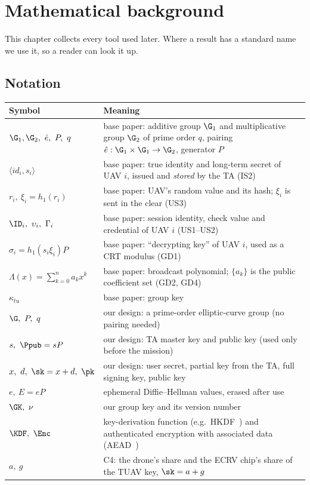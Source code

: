 \chapter{Mathematical background}\label{ch:bg}
This chapter collects every tool used later. Where a result has a standard name we use it, so a reader can look it up.

\section{Notation}
\begin{center}
\small
\begin{tabularx}{\linewidth}{@{}l X@{}}
\toprule
\textbf{Symbol} & \textbf{Meaning}\\
\midrule
$\G_1,\G_2,\ \hat e,\ P,\ q$ & base paper: additive group $\G_1$ and multiplicative group $\G_2$ of prime order $q$, pairing $\hat e:\G_1\times\G_1\to\G_2$, generator $P$\\
$\langle id_i,s_i\rangle$ & base paper: true identity and long-term secret of UAV $i$, issued and \emph{stored} by the TA (IS2)\\
$r_i,\ \xi_i=h_1(r_i)$ & base paper: UAV's random value and its hash; $\xi_i$ is sent in the clear (US3)\\
$\ID_i,\ \upsilon_i,\ \Gamma_i$ & base paper: session identity, check value and credential of UAV $i$ (US1--US2)\\
$\sigma_i=h_1(s_i\xi_i)P$ & base paper: ``decrypting key'' of UAV $i$, used as a CRT modulus (GD1)\\
$\Lambda(x)=\sum_{k=0}^{n}a_kx^k$ & base paper: broadcast polynomial; $\{a_k\}$ is the public coefficient set (GD2, GD4)\\
$\kappa_{tu}$ & base paper: group key\\
\midrule
$\G,\ P,\ q$ & our design: a prime-order elliptic-curve group (no pairing needed)\\
$s,\ \Ppub=sP$ & our design: TA master key and public key (used only before the mission)\\
$x,\ d,\ \sk=x+d,\ \pk$ & our design: user secret, partial key from the TA, full signing key, public key\\
$e,\ E=eP$ & ephemeral Diffie--Hellman values, erased after use\\
$\GK,\ \nu$ & our group key and its version number\\
$\KDF,\ \Enc$ & key-derivation function (e.g.\ HKDF~\cite{hkdf}) and authenticated encryption with associated data (AEAD~\cite{aead})\\
$a,\ g$ & C4: the drone's share and the ECRV chip's share of the TUAV key, $\sk=a+g$\\
\bottomrule
\end{tabularx}
\end{center}

